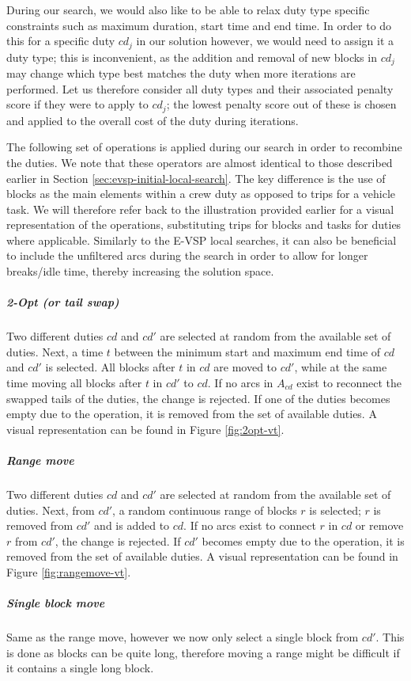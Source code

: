 \documentclass[]{article}
\begin{document}
During our search, we would also like to be able to relax duty type specific constraints such as maximum duration, start time and end time. In order to do this for a specific duty $cd_j$ in our solution however, we would need to assign it a duty type; this is inconvenient, as the addition and removal of new blocks in $cd_j$ may change which type best matches the duty when more iterations are performed. Let us therefore consider all duty types and their associated penalty score if they were to apply to $cd_j$; the lowest penalty score out of these is chosen and applied to the overall cost of the duty during iterations. 

The following set of operations is applied during our search in order to recombine the duties. We note that these operators are almost identical to those described earlier in Section \ref{sec:evsp-initial-local-search}. The key difference is the use of blocks as the main elements within a crew duty as opposed to trips for a vehicle task. We will therefore refer back to the illustration provided earlier for a visual representation of the operations, substituting trips for blocks and tasks for duties where applicable. Similarly to the E-VSP local searches, it can also be beneficial to include the unfiltered arcs during the search in order to allow for longer breaks/idle time, thereby increasing the solution space.

\noindent\subparagraph{2-Opt (or tail swap)} Two different duties $cd$ and $cd'$ are selected at random from the available set of duties. Next, a time $t$ between the minimum start and maximum end time of $cd$ and $cd'$ is selected. All blocks after $t$ in $cd$ are moved to $cd'$, while at the same time moving all blocks after $t$ in $cd'$ to $cd$. If no arcs in $A_{cd}$ exist to reconnect the swapped tails of the duties, the change is rejected. If one of the duties becomes empty due to the operation, it is removed from the set of available duties. A visual representation can be found in Figure \ref{fig:2opt-vt}.
\noindent\subparagraph{Range move} Two different duties $cd$ and $cd'$ are selected at random from the available set of duties. Next, from $cd'$, a random continuous range of blocks $r$ is selected; $r$ is removed from $cd'$ and is added to $cd$. If no arcs exist to connect $r$ in $cd$ or remove $r$ from $cd'$, the change is rejected. If $cd'$ becomes empty due to the operation, it is removed from the set of available duties. A visual representation can be found in Figure \ref{fig:rangemove-vt}.
\noindent\subparagraph{Single block move} Same as the range move, however we now only select a single block from $cd'$. This is done as blocks can be quite long, therefore moving a range might be difficult if it contains a single long block. \\
\end{document}
